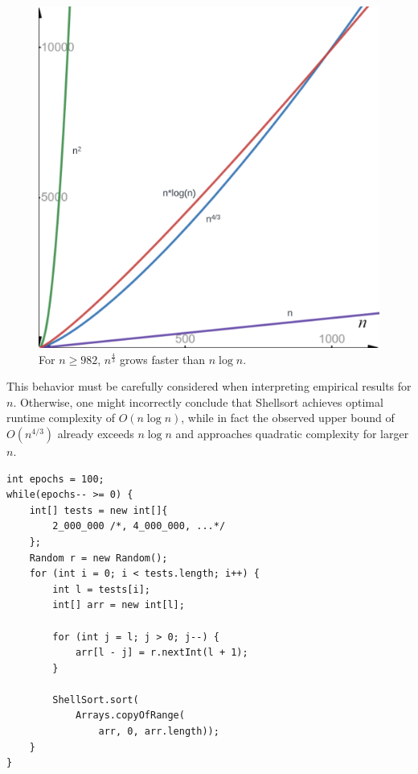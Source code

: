 \begin{figure}[!h]
    \centering
    \includegraphics[width=1\columnwidth]{img/lognplot}
    \caption{For $n \geq 982$, $n^{\frac{4}{3}}$ grows faster than $n \log n$.}
    \label{fig:lognplot}
\end{figure}

This behavior must be carefully considered when interpreting empirical results for $n$.
Otherwise, one might incorrectly conclude that Shellsort achieves optimal runtime complexity of $O(n \log n)$, while in fact the observed upper bound of $O(n^{4/3})$ already exceeds $n \log n$ and approaches quadratic complexity for larger $n$.



\vspace{4mm}
\begin{lstlisting}[style=javastyle, caption={Code for Shellsort-testing large randomized arrays.}, label=lst:rand]
int epochs = 100;
while(epochs-- >= 0) {
    int[] tests = new int[]{
        2_000_000 /*, 4_000_000, ...*/
    };
    Random r = new Random();
    for (int i = 0; i < tests.length; i++) {
        int l = tests[i];
        int[] arr = new int[l];

        for (int j = l; j > 0; j--) {
            arr[l - j] = r.nextInt(l + 1);
        }

        ShellSort.sort(
            Arrays.copyOfRange(
                arr, 0, arr.length));
    }
}
\end{lstlisting}
\vspace{4mm}



